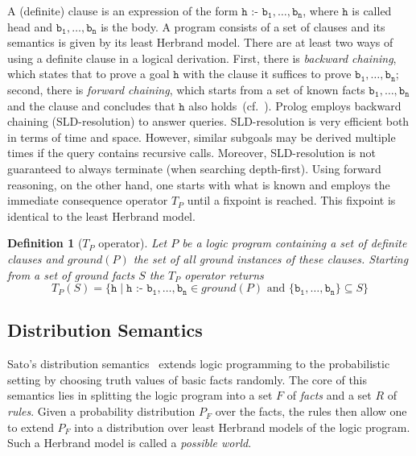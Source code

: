 \documentclass{tlp}
\newtheorem{definition}{Definition}
\newcommand{\coloneq}{\mbox{ :- }}
\begin{document}
A (definite) clause is an expression of the form $\mathtt{h\coloneq
  b_1, \ldots ,b_n}$, where $\mathtt{h}$ is called head and
$\mathtt{b_1,\ldots,b_n}$ is the body.  A program consists of a set of
clauses and its semantics is given by its least Herbrand model.  There
are at least two ways of using a definite clause in a logical
derivation.  First, there is \emph{backward chaining}, which states
that to prove a goal $\mathtt{h}$ with the clause it suffices to prove
$\mathtt{b_1, \ldots,b_n}$; second, there is \emph{forward chaining},
which starts from a set of known facts $\mathtt{b_1, \ldots ,b_n}$ and
the clause and concludes that $\mathtt{h}$ also
holds~(cf.~\cite{nilsson:book}).  Prolog employs backward chaining
(SLD-resolution) to answer queries.  SLD-resolution is very efficient
both in terms of time and space. However, similar subgoals may be
derived multiple times if the query contains recursive
calls. Moreover, SLD-resolution is not guaranteed to always terminate
(when searching depth-first).  Using forward reasoning, on the other
hand, one starts with what is known and employs the immediate
consequence operator $T_P$ until a fixpoint is reached. This fixpoint
is identical to the least Herbrand model.

\begin{definition}[$T_P$ operator]
  \label{def:tpop}
  Let $P$ be a logic program containing a set of definite clauses and
  $ground(P)$ the set of all ground instances of these clauses.
  Starting from a set of ground facts $S$ the $T_P$ operator returns
  \begin{equation*}
    T_P(S) = \{ \mathtt{h} \mid \mathtt{h \coloneq b_1,\ldots,b_n} \in
    ground(P) \mbox{ and } \{ \mathtt{b_1}, \ldots , \mathtt{b_n}\}
    \subseteq S\}
  \end{equation*}
\end{definition}


\subsection{Distribution Semantics}
\label{sec:ds}

Sato's distribution semantics~\cite{Sato:95} extends logic programming
to the probabilistic setting by choosing truth values of basic facts
randomly.  The core of this semantics lies in splitting the logic
program into a set $F$ of \emph{facts} and a set $R$ of
\emph{rules}. Given a probability distribution $P_F$ over the facts,
the rules then allow one to extend $P_F$ into a distribution over
least Herbrand models of the logic program. Such a Herbrand model is
called a \emph{possible world}.
\end{document}
